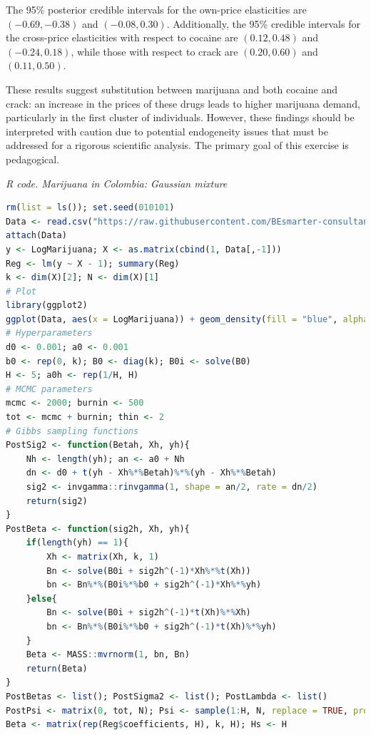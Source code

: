 \begin{enumerate}[leftmargin=*]
The 95\% posterior credible intervals for the own-price elasticities are $(-0.69, -0.38)$ and $(-0.08, 0.30)$. Additionally, the 95\% credible intervals for the cross-price elasticities with respect to cocaine are $(0.12, 0.48)$ and $(-0.24, 0.18)$, while those with respect to crack are $(0.20, 0.60)$ and $(0.11, 0.50)$.  

These results suggest substitution between marijuana and both cocaine and crack: an increase in the prices of these drugs leads to higher marijuana demand, particularly in the first cluster of individuals. However, these findings should be interpreted with caution due to potential endogeneity issues that must be addressed for a rigorous scientific analysis. The primary goal of this exercise is pedagogical.  
 

\begin{tcolorbox}[enhanced,width=4.67in,center upper,
	fontupper=\large\bfseries,drop shadow southwest,sharp corners]
	\textit{R code. Marijuana in Colombia: Gaussian mixture}
	\begin{VF}
		\begin{lstlisting}[language=R]
rm(list = ls()); set.seed(010101)
Data <- read.csv("https://raw.githubusercontent.com/BEsmarter-consultancy/BSTApp/refs/heads/master/DataApp/MarijuanaColombia.csv")
attach(Data)
y <- LogMarijuana; X <- as.matrix(cbind(1, Data[,-1]))
Reg <- lm(y ~ X - 1); summary(Reg)
k <- dim(X)[2]; N <- dim(X)[1]
# Plot
library(ggplot2)
ggplot(Data, aes(x = LogMarijuana)) + geom_density(fill = "blue", alpha = 0.3) + labs(title = "Density Plot", x = "y", y = "Density") + theme_minimal()
# Hyperparameters
d0 <- 0.001; a0 <- 0.001
b0 <- rep(0, k); B0 <- diag(k); B0i <- solve(B0)
H <- 5; a0h <- rep(1/H, H)
# MCMC parameters
mcmc <- 2000; burnin <- 500
tot <- mcmc + burnin; thin <- 2
# Gibbs sampling functions
PostSig2 <- function(Betah, Xh, yh){
	Nh <- length(yh); an <- a0 + Nh
	dn <- d0 + t(yh - Xh%*%Betah)%*%(yh - Xh%*%Betah)
	sig2 <- invgamma::rinvgamma(1, shape = an/2, rate = dn/2)
	return(sig2)
}
PostBeta <- function(sig2h, Xh, yh){
	if(length(yh) == 1){
		Xh <- matrix(Xh, k, 1)
		Bn <- solve(B0i + sig2h^(-1)*Xh%*%t(Xh))
		bn <- Bn%*%(B0i%*%b0 + sig2h^(-1)*Xh%*%yh)
	}else{
		Bn <- solve(B0i + sig2h^(-1)*t(Xh)%*%Xh)
		bn <- Bn%*%(B0i%*%b0 + sig2h^(-1)*t(Xh)%*%yh)
	}
	Beta <- MASS::mvrnorm(1, bn, Bn)
	return(Beta)
}
PostBetas <- list(); PostSigma2 <- list(); PostLambda <- list()
PostPsi <- matrix(0, tot, N); Psi <- sample(1:H, N, replace = TRUE, prob = a0h)
Beta <- matrix(rep(Reg$coefficients, H), k, H); Hs <- H
\end{lstlisting}
	\end{VF}
\end{tcolorbox}


\end{enumerate}
